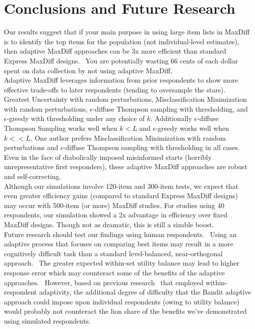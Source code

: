 \documentclass[nonblindrev]{informs3}
\begin{document}
\section{Conclusions and Future Research}
Our results suggest that if your main purpose in using large item lists in MaxDiff is to identify the top items for the population (not individual-level estimates), then adaptive MaxDiff approaches can be 3x more efficient than standard Express MaxDiff designs.  You are potentially wasting 66 cents of each dollar spent on data collection by not using adaptive MaxDiff.\\
Adaptive MaxDiff leverages information from prior respondents to show more effective trade-offs to later respondents (tending to oversample the stars). Greatest Uncertainty with random perturbations, Misclassification Minimization with random perturbations, $\epsilon$-diffuse Thompson sampling with thresholding, and $\epsilon$-greedy with thresholding under any choice of $k$. Additionally $\epsilon$-diffuse Thompson Sampling works well when $k<L$ and $\epsilon$-greedy works well when $k<<L$. One author prefers Misclassification Minimization with random perturbations and $\epsilon$-diffuse Thompson sampling with thresholding in all cases.\\
Even in the face of diabolically imposed misinformed starts (horribly unrepresentative first responders), these adaptive MaxDiff approaches are robust and self-correcting.\\
Although our simulations involve 120-item and 300-item tests, we expect that even greater efficiency gains (compared to standard Express MaxDiff designs) may occur with 500-item (or more) MaxDiff studies. For studies using 40 respondents, our simulation showed a 2x advantage in efficiency over fixed MaxDiff designs. Though not as dramatic, this is still a sizable boost.\\
Future research should test our findings using human respondents.  Using an adaptive process that focuses on comparing best items may result in a more cognitively difficult task than a standard level-balanced, near-orthogonal approach.  The greater expected within-set utility balance may lead to higher response error which may counteract some of the benefits of the adaptive approaches.  However, based on previous research~\cite{orme2006adaptive} that employed within-respondent adaptivity, the additional degree of difficulty that the Bandit adaptive approach could impose upon individual respondents (owing to utility balance) would probably not counteract the lion share of the benefits we've demonstrated using simulated respondents.\\
\end{document}
